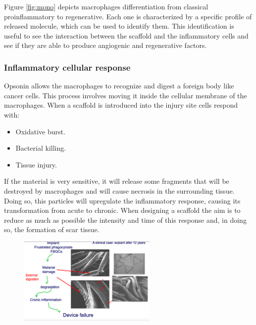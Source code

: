 		Figure \ref{fig:mono} depicts macrophages differentiation from classical proinflammatory to regenerative.
		Each one is characterized by a specific profile of released molecule, which can be used to identify them.
		This identification is useful to see the interaction between the scaffold and the inflammatory cells and see if they are able to produce angiogenic and regenerative factors.

		\subsubsection{Inflammatory cellular response}
		Opsonin allows the macrophages to recognize and digest a foreign body like cancer cells.
		This process involves moving it inside the cellular membrane of the macrophages.
		When a scaffold is introduced into the injury site cells respond with:

		\begin{multicols}{3}
			\begin{itemize}
				\item Oxidative burst.
				\item Bacterial killing.
				\item Tissue injury.
			\end{itemize}
		\end{multicols}

		If the material is very sensitive, it will release some fragments that will be destroyed by macrophages and will cause necrosis in the surrounding tissue.
		Doing so, this particles will upregulate the inflammatory response, causing its transformation from acute to chronic.
		When designing a scaffold the aim is to reduce as much as possible the intensity and time of this response and, in doing so, the formation of scar tissue.

		\begin{figure}[ht]
			\centering
			\includegraphics[width=0.6\textwidth]{failure}
			\caption{\label{fig:failure}}
		\end{figure}

